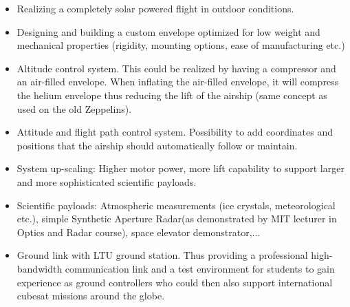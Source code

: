 \begin{itemize}
\item Realizing a completely solar powered flight in outdoor conditions.
\item Designing and building a custom envelope optimized for low weight and mechanical properties (rigidity, mounting options, ease of manufacturing etc.)
\item Altitude control system. This could be realized by having a compressor and an air-filled envelope. When inflating the air-filled envelope, it will compress the helium envelope thus reducing the lift of the airship (same concept as used on the old Zeppelins).
\item Attitude and flight path control system. Possibility to add coordinates and positions that the airship should automatically follow or maintain.
\item System up-scaling: Higher motor power, more lift capability to support larger and more sophisticated scientific payloads.
\item Scientific payloads: Atmospheric measurements (ice crystals, meteorological etc.), simple Synthetic Aperture Radar(as demonstrated by MIT lecturer in Optics and Radar course), space elevator demonstrator,...
\item Ground link with LTU ground station. Thus providing a professional high-bandwidth communication link and a test environment for students to gain experience as ground controllers who could then also support international cubesat missions around the globe.
\end{itemize}